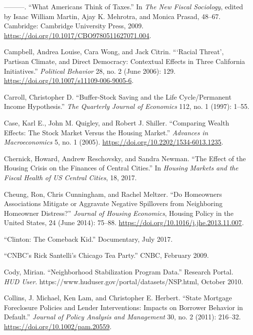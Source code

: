 \documentclass[12pt,oneside]{psthesis}
\begin{document}
\leavevmode\hypertarget{ref-campbell2009what}{}%
---------. ``What Americans Think of Taxes.'' In \emph{The New Fiscal Sociology}, edited by Isaac William Martin, Ajay K. Mehrotra, and Monica Prasad, 48--67. Cambridge: Cambridge University Press, 2009. \url{https://doi.org/10.1017/CBO9780511627071.004}.

\leavevmode\hypertarget{ref-campbell2006racial}{}%
Campbell, Andrea Louise, Cara Wong, and Jack Citrin. ```Racial Threat', Partisan Climate, and Direct Democracy: Contextual Effects in Three California Initiatives.'' \emph{Political Behavior} 28, no. 2 (June 2006): 129. \url{https://doi.org/10.1007/s11109-006-9005-6}.

\leavevmode\hypertarget{ref-carroll1997bufferstock}{}%
Carroll, Christopher D. ``Buffer-Stock Saving and the Life Cycle/Permanent Income Hypothesis.'' \emph{The Quarterly Journal of Economics} 112, no. 1 (1997): 1--55.

\leavevmode\hypertarget{ref-case2005comparing}{}%
Case, Karl E., John M. Quigley, and Robert J. Shiller. ``Comparing Wealth Effects: The Stock Market Versus the Housing Market.'' \emph{Advances in Macroeconomics} 5, no. 1 (2005). \url{https://doi.org/10.2202/1534-6013.1235}.

\leavevmode\hypertarget{ref-chernick2017effect}{}%
Chernick, Howard, Andrew Reschovsky, and Sandra Newman. ``The Effect of the Housing Crisis on the Finances of Central Cities.'' In \emph{Housing Markets and the Fiscal Health of US Central Cities}, 18, 2017.

\leavevmode\hypertarget{ref-cheung2014homeowners}{}%
Cheung, Ron, Chris Cunningham, and Rachel Meltzer. ``Do Homeowners Associations Mitigate or Aggravate Negative Spillovers from Neighboring Homeowner Distress?'' \emph{Journal of Housing Economics}, Housing Policy in the United States, 24 (June 2014): 75--88. \url{https://doi.org/10.1016/j.jhe.2013.11.007}.

\leavevmode\hypertarget{ref-albright2017clinton}{}%
``Clinton: The Comeback Kid.'' Documentary, July 2017.

\leavevmode\hypertarget{ref-santelli2009cnbc}{}%
``CNBC's Rick Santelli's Chicago Tea Party.'' CNBC, February 2009.

\leavevmode\hypertarget{ref-cody2010neighborhood}{}%
Cody, Mirian. ``Neighborhood Stabilization Program Data.'' Research Portal. \emph{HUD User}. https://www.huduser.gov/portal/datasets/NSP.html, October 2010.

\leavevmode\hypertarget{ref-collins2011state}{}%
Collins, J. Michael, Ken Lam, and Christopher E. Herbert. ``State Mortgage Foreclosure Policies and Lender Interventions: Impacts on Borrower Behavior in Default.'' \emph{Journal of Policy Analysis and Management} 30, no. 2 (2011): 216--32. \url{https://doi.org/10.1002/pam.20559}.
\end{document}
